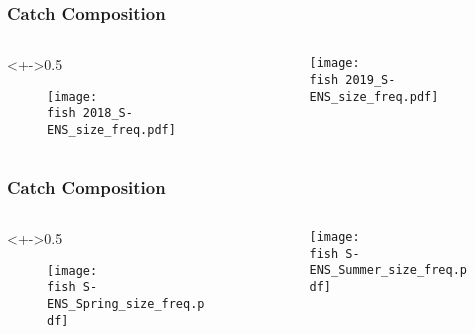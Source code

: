 \documentclass{beamer}
\begin{document}
\begin{frame}
	\frametitle{Catch Composition}
	
	\begin{columns}
		\begin{column}<+->{0.5\textwidth}
			\vspace*{-0.5cm}
			\begin{figure}
				\centerline{\texttt{[image: \\fish 2018\_S-ENS\_size\_freq.pdf]}}
				
			\end{figure}
		\end{column}
		
		\begin{column}{0.5\textwidth}
			\begin{figure}
				\vspace*{-0.5cm}
				
				\centerline{\texttt{[image: \\fish 2019\_S-ENS\_size\_freq.pdf]}}
				
			\end{figure}
			
		\end{column}
	\end{columns}
	
	
\end{frame}





\begin{frame}
	\frametitle{Catch Composition}
	
	\begin{columns}
		\begin{column}<+->{0.5\textwidth}
			\vspace*{-0.5cm}
			\begin{figure}
				\centerline{\texttt{[image: \\fish S-ENS\_Spring\_size\_freq.pdf]}}
				
			\end{figure}
		\end{column}
		
		\begin{column}{0.5\textwidth}
			
			\vspace*{-0.5cm}
			\begin{figure}
				
				\centerline{\texttt{[image: \\fish S-ENS\_Summer\_size\_freq.pdf]}}
				
			\end{figure}
			
		\end{column}
	\end{columns}
	
	
\end{frame}
\end{document}
